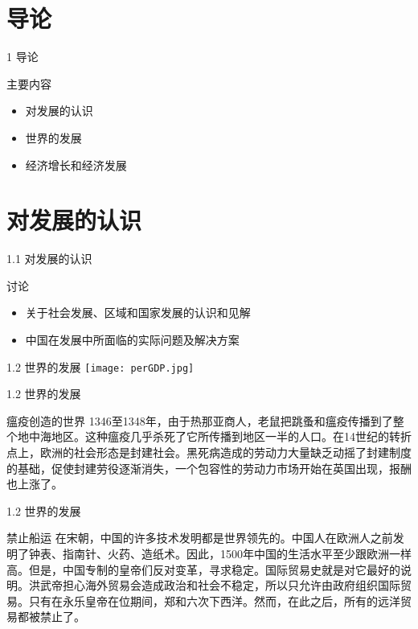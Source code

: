 \documentclass[UTF8,14pt,blue,hyperref={CJKbookmarks=true}]{beamer}
\begin{document}
\section{导论}
\begin{frame}{1 导论}
\begin{block}{主要内容}
\begin{itemize}
\item 对发展的认识
\item 世界的发展
\item 经济增长和经济发展
\end{itemize}
\end{block}
\end{frame}

\section{对发展的认识}
\begin{frame}{1.1 对发展的认识}
\begin{block}{讨论}
\begin{itemize}
\item 关于社会发展、区域和国家发展的认识和见解
\item 中国在发展中所面临的实际问题及解决方案
\end{itemize}
\end{block}
\end{frame}

\begin{frame}{1.2 世界的发展}
\texttt{[image: perGDP.jpg]}
\end{frame}

\begin{frame}{1.2 世界的发展}
\begin{block}{瘟疫创造的世界}
1346至1348年，由于热那亚商人，老鼠把跳蚤和瘟疫传播到了整个地中海地区。这种瘟疫几乎杀死了它所传播到地区一半的人口。在14世纪的转折点上，欧洲的社会形态是封建社会。黑死病造成的劳动力大量缺乏动摇了封建制度的基础，促使封建劳役逐渐消失，一个包容性的劳动力市场开始在英国出现，报酬也上涨了。
\end{block}
\end{frame}

\begin{frame}{1.2 世界的发展}
\begin{block}{禁止船运}
在宋朝，中国的许多技术发明都是世界领先的。中国人在欧洲人之前发明了钟表、指南针、火药、造纸术。因此，1500年中国的生活水平至少跟欧洲一样高。但是，中国专制的皇帝们反对变革，寻求稳定。国际贸易史就是对它最好的说明。洪武帝担心海外贸易会造成政治和社会不稳定，所以只允许由政府组织国际贸易。只有在永乐皇帝在位期间，郑和六次下西洋。然而，在此之后，所有的远洋贸易都被禁止了。
\end{block}
\end{frame}
\end{document}
